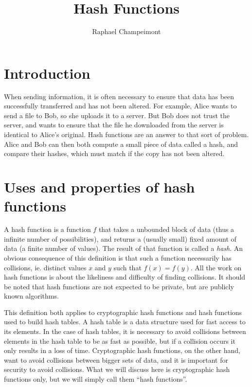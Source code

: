 \documentclass[12pt,a4paper]{article}
\title{Hash Functions}
\author{Raphael Champeimont}
\begin{document}

\nocite{*}

\maketitle

\tableofcontents

\newpage

\section{Introduction}
When sending information, it is often necessary to ensure that data has been successfully transferred and has not been altered. For example, Alice wants to send a file to Bob, so she uploads it to a server. But Bob does not trust the server, and wants to ensure that the file he downloaded from the server is identical to Alice's original. Hash functions are an answer to that sort of problem. Alice and Bob can then both compute a small piece of data called a hash, and compare their hashes, which must match if the copy has not been altered.


\section{Uses and properties of hash functions}
A hash function is a function $f$ that takes a unbounded block of data (thus a infinite number of possibilities), and returns a (usually small) fixed amount of data (a finite number of values). The result of that function is called a {\em hash}. An obvious consequence of this definition is that such a function necessarily has collisions, ie. distinct values $x$ and $y$ such that $f(x)=f(y)$. All the work on hash functions is about the likeliness and difficulty of finding collisions. It should be noted that hash functions are not expected to be private, but are publicly known algorithms.

This definition both applies to cryptographic hash functions and hash functions used to build hash tables. A hash table is a data structure used for fast access to its elements. In the case of hash tables, it is necessary to avoid collisions between elements in the hash table to be as fast as possible, but if a collision occurs it only results in a loss of time. Cryptographic hash functions, on the other hand, want to avoid collisions between bigger sets of data, and it is important for security to avoid collisions. What we will discuss here is cryptographic hash functions only, but we will simply call them ``hash functions''.
\end{document}
